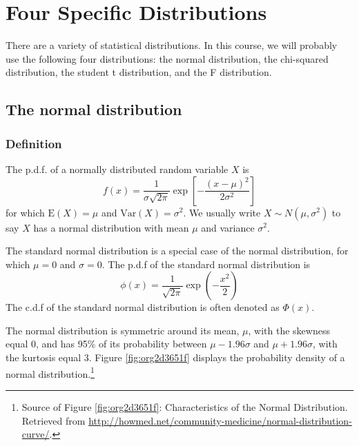 \documentclass[a4paper,11pt]{article}
\begin{document}
\section{Four Specific Distributions}
\label{sec:orge04c797}

There are a variety of statistical distributions. In this course, we
will probably use the following four distributions: the normal
distribution, the chi-squared distribution, the student t
distribution, and the F distribution. 

\subsection{The normal distribution}
\label{sec:org013d61b}

\subsubsection*{Definition}
\label{sec:orga6c2d15}
The p.d.f. of a normally distributed random variable \(X\) is
\[ f(x) =
\frac{1}{\sigma\sqrt{2\pi}}\exp\left[-\frac{(x-\mu)^{2}}{2\sigma^{2}}\right]
\]
for which \(\mathrm{E}(X) = \mu\) and \(\mathrm{Var}(X) = \sigma^{2}\). We
usually write \(X \sim N(\mu, \sigma^{2})\) to say \(X\) has a normal
distribution with mean \(\mu\) and variance \(\sigma^2\). 

The standard normal distribution is a special case of the normal
distribution, for which \(\mu = 0\) and \(\sigma = 0\). The p.d.f of the
standard normal distribution is
\[
\phi(x) = \frac{1}{\sqrt{2\pi}}\exp\left(-\frac{x^2}{2}\right)
\]
The c.d.f of the standard normal distribution is often denoted as
\(\Phi(x)\).

The normal distribution is symmetric around its mean, \(\mu\), with the
skewness equal 0, and has 95\% of its probability between
\(\mu-1.96\sigma\) and \(\mu+1.96\sigma\), with the kurtosis
equal 3. Figure \ref{fig:org2d3651f} displays the probability density of a
normal distribution.\footnote{Source of Figure \ref{fig:org2d3651f}: Characteristics of the
Normal Distribution. Retrieved from
\url{http://howmed.net/community-medicine/normal-distribution-curve/}.}
\end{document}
